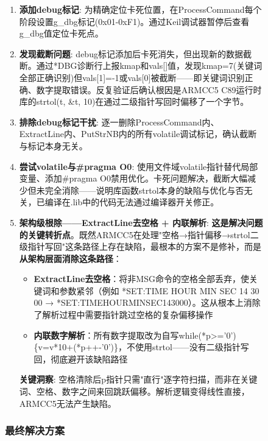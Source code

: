 \documentclass[12pt,hyperref,a4paper,UTF8]{ctexart}
\begin{document}
\begin{figure}[!htbp]
\begin{enumerate}
    \item \textbf{添加debug标记}: 为精确定位卡死位置，在ProcessCommand每个阶段设置g\_dbg标记(0x01-0xF1)。通过Keil调试器暂停后查看g\_dbg值定位卡死点。

    \item \textbf{发现截断问题}: debug标记添加后卡死消失，但出现新的数据截断。通过*DBG诊断行上报kmap和vals[]值，发现kmap=7(关键词全部正确识别)但vals[1]=-1或vals[0]被截断——即关键词识别正确、数字提取错误。反复验证后确认根因是ARMCC5 C89运行时库的strtol(t, \&t, 10)在通过二级指针写回时偏移了一个字节。

    \item \textbf{排除debug标记干扰}: 逐一删除ProcessCommand内、ExtractLine内、PutStrNB内的所有volatile调试标记，确认截断与标记本身无关。

    \item \textbf{尝试volatile与\#pragma O0}: 使用文件域volatile指针替代局部变量、添加\#pragma O0禁用优化。卡死问题解决，截断大幅减少但未完全消除——说明库函数strtol本身的缺陷与优化与否无关，已编译在.lib中的代码无法通过编译器开关修正。

    \item \textbf{架构级根除——ExtractLine去空格 + 内联解析}: \textbf{这是解决问题的关键转折点}。既然ARMCC5在处理"空格→指针偏移→strtol二级指针写回"这条路径上存在缺陷，最根本的方案不是修补，而是\textbf{从架构层面消除这条路径}：
    \begin{itemize}
        \item \textbf{ExtractLine去空格}：将非MSG命令的空格全部丢弃，使关键词和参数紧邻（例如 *SET:TIME HOUR MIN SEC 14 30 00 → *SET:TIMEHOURMINSEC143000）。这从根本上消除了解析过程中需要指针跳过空格的复杂偏移操作
        \item \textbf{内联数字解析}：所有数字提取改为自写while(*p>='0')\{v=v*10+(*p++-'0')\}，不使用strtol——没有二级指针写回，彻底避开该缺陷路径
    \end{itemize}
    \textbf{关键洞察}: 空格清除后p指针只需"直行"逐字符扫描，而非在关键词、空格、数字之间来回跳跃偏移。解析逻辑变得线性直接，ARMCC5无法产生缺陷。

\end{enumerate}

\subsubsection{最终解决方案}


\end{figure}
\end{document}
